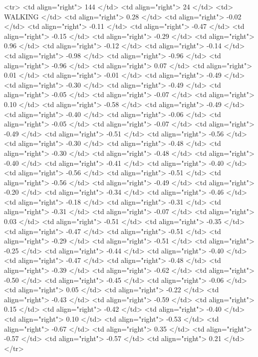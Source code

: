   <tr> <td align="right"> 144 </td> <td align="right">  24 </td> <td> WALKING </td> <td align="right"> 0.28 </td> <td align="right"> -0.02 </td> <td align="right"> -0.11 </td> <td align="right"> -0.47 </td> <td align="right"> -0.15 </td> <td align="right"> -0.29 </td> <td align="right"> 0.96 </td> <td align="right"> -0.12 </td> <td align="right"> -0.14 </td> <td align="right"> -0.98 </td> <td align="right"> -0.96 </td> <td align="right"> -0.96 </td> <td align="right"> 0.07 </td> <td align="right"> 0.01 </td> <td align="right"> -0.01 </td> <td align="right"> -0.49 </td> <td align="right"> -0.30 </td> <td align="right"> -0.49 </td> <td align="right"> -0.05 </td> <td align="right"> -0.07 </td> <td align="right"> 0.10 </td> <td align="right"> -0.58 </td> <td align="right"> -0.49 </td> <td align="right"> -0.40 </td> <td align="right"> -0.06 </td> <td align="right"> -0.05 </td> <td align="right"> -0.07 </td> <td align="right"> -0.49 </td> <td align="right"> -0.51 </td> <td align="right"> -0.56 </td> <td align="right"> -0.30 </td> <td align="right"> -0.48 </td> <td align="right"> -0.30 </td> <td align="right"> -0.48 </td> <td align="right"> -0.40 </td> <td align="right"> -0.41 </td> <td align="right"> -0.40 </td> <td align="right"> -0.56 </td> <td align="right"> -0.51 </td> <td align="right"> -0.56 </td> <td align="right"> -0.49 </td> <td align="right"> -0.20 </td> <td align="right"> -0.34 </td> <td align="right"> -0.46 </td> <td align="right"> -0.18 </td> <td align="right"> -0.31 </td> <td align="right"> -0.31 </td> <td align="right"> -0.07 </td> <td align="right"> 0.03 </td> <td align="right"> -0.51 </td> <td align="right"> -0.35 </td> <td align="right"> -0.47 </td> <td align="right"> -0.51 </td> <td align="right"> -0.29 </td> <td align="right"> -0.51 </td> <td align="right"> -0.25 </td> <td align="right"> -0.44 </td> <td align="right"> -0.40 </td> <td align="right"> -0.47 </td> <td align="right"> -0.48 </td> <td align="right"> -0.39 </td> <td align="right"> -0.62 </td> <td align="right"> -0.50 </td> <td align="right"> -0.45 </td> <td align="right"> -0.06 </td> <td align="right"> 0.05 </td> <td align="right"> -0.22 </td> <td align="right"> -0.43 </td> <td align="right"> -0.59 </td> <td align="right"> 0.15 </td> <td align="right"> -0.42 </td> <td align="right"> -0.40 </td> <td align="right"> 0.10 </td> <td align="right"> -0.53 </td> <td align="right"> -0.67 </td> <td align="right"> 0.35 </td> <td align="right"> -0.57 </td> <td align="right"> -0.57 </td> <td align="right"> 0.21 </td> </tr>
